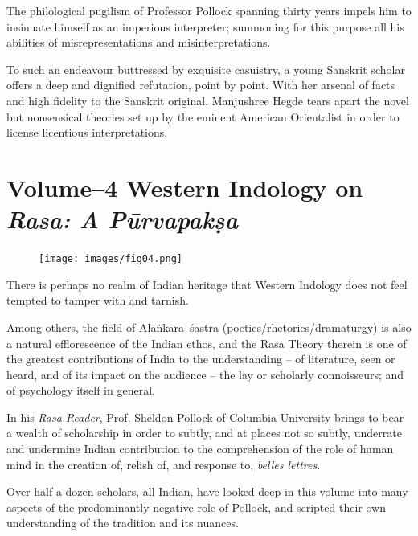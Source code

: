 The philological pugilism of Professor Pollock spanning thirty years impels him to insinuate himself as an imperious interpreter; summoning for this purpose all his abilities of misrepresentations and misinterpretations.

To such an endeavour buttressed by exquisite casuistry, a young Sanskrit scholar offers a deep and dignified refutation, point by point. With her arsenal of facts and high fidelity to the Sanskrit original, Manjushree Hegde tears apart the novel but nonsensical theories set up by the eminent American Orientalist in order to license licentious interpretations.

\newpage

\section*{Volume–4 Western Indology on \textit{Rasa: A Pūrvapakṣa}}

\begin{figure}[!htbp]
\texttt{[image: images/fig04.png]}
\end{figure}

There is perhaps no realm of Indian heritage that Western Indology does not feel tempted to tamper with and tarnish.

Among others, the field of Alaṅkāra–śastra (poetics/rhetorics/\break dramaturgy) is also a natural efflorescence of the Indian ethos, and the Rasa Theory therein is one of the greatest contributions of India to the understanding – of literature, seen or heard, and of its impact on the audience – the lay or scholarly connoisseurs; and of psychology itself in general.

In his \textit{Rasa Reader}, Prof. Sheldon Pollock of Columbia University brings to bear a wealth of scholarship in order to subtly, and at places not so subtly, underrate and undermine Indian contribution to the comprehension of the role of human mind in the creation of, relish of, and response to, \textit{belles lettres}.

Over half a dozen scholars, all Indian, have looked deep in this volume into many aspects of the predominantly negative role of Pollock, and scripted their own understanding of the tradition and its nuances.

